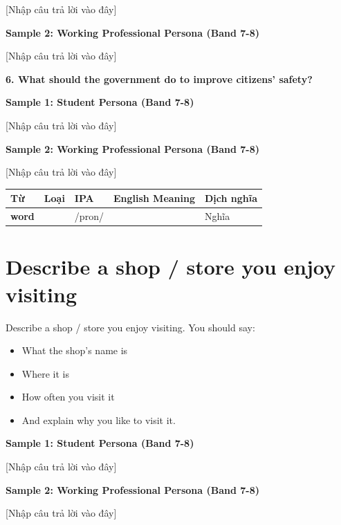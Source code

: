 [Nhập câu trả lời vào đây]

\textbf{Sample 2: Working Professional Persona (Band 7-8)}

[Nhập câu trả lời vào đây]

\separator

\begin{ieltsquestion}
\textbf{6. What should the government do to improve citizens' safety?}
\end{ieltsquestion}
\textbf{Sample 1: Student Persona (Band 7-8)}

[Nhập câu trả lời vào đây]

\textbf{Sample 2: Working Professional Persona (Band 7-8)}

[Nhập câu trả lời vào đây]

\separator


\vspace{0.8em}
\begin{center}
\renewcommand{\arraystretch}{1.65}
\begin{tabularx}{\textwidth}{|V{0.22\textwidth}|C{0.07\textwidth}|I{0.20\textwidth}|Y|V{0.18\textwidth}|}
\hline
{}
\textbf{Từ} & \textbf{Loại} & \textbf{IPA} & \textbf{English Meaning} & \textbf{Dịch nghĩa} \\
\hline
\textbf{word} & & /pron/ & & Nghĩa \\ \hline
\end{tabularx}
\end{center}

\newpage

\section{Describe a shop / store you enjoy visiting}
\begin{ieltsprompt}
Describe a shop / store you enjoy visiting.
You should say:
\begin{itemize}[leftmargin=2em, itemsep=2pt]
\item What the shop's name is
\item Where it is
\item How often you visit it
\item And explain why you like to visit it.
\end{itemize}
\end{ieltsprompt}
\begin{ieltsanswer}
\textbf{Sample 1: Student Persona (Band 7-8)}

[Nhập câu trả lời vào đây]

\textbf{Sample 2: Working Professional Persona (Band 7-8)}

[Nhập câu trả lời vào đây]
\end{ieltsanswer}


